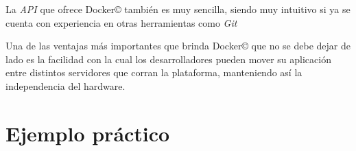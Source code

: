 \documentclass[14pt]{extarticle}
\newcommand{\docker}{Docker\copyright}
\begin{document}
        La \textit{API} que ofrece \docker{} también es muy sencilla, siendo muy intuitivo si ya se cuenta con experiencia en otras herramientas como \textit{Git}

        Una de las ventajas más importantes que brinda \docker{} que no se debe dejar de lado es la facilidad con la cual los desarrolladores pueden mover su aplicación entre distintos servidores que corran la plataforma, manteniendo así la independencia del hardware.

    \clearpage
    \section{Ejemplo práctico}


    \clearpage
    
    
\end{document}
